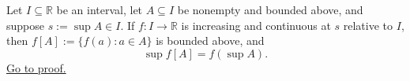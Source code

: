 \begin{theorem}
\label{thm:increasing-image-preserves-suprema}
Let $I\subseteq\mathbb{R}$ be an interval, let $A\subseteq I$ be nonempty and
bounded above, and suppose $s:=\sup A\in I$.  If $f\colon I\to\mathbb{R}$ is
increasing and continuous at $s$ relative to $I$, then
$f[A]:=\{f(a):a\in A\}$ is bounded above, and
\[
  \sup f[A]=f(\sup A).
\]
\hyperref[prf:increasing-image-preserves-suprema]{Go to proof.}
\end{theorem}